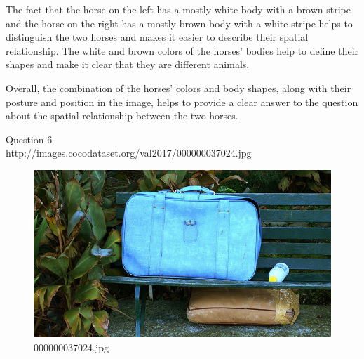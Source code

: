 \begin{enumerate}
        The fact that the horse on the left has a mostly white body with a brown stripe and the horse on the right has a mostly brown body with a white stripe helps to distinguish the two horses and makes it easier to describe their spatial relationship. The white and brown colors of the horses’ bodies help to define their shapes and make it clear that they are different animals.
        
        Overall, the combination of the horses’ colors and body shapes, along with their posture and position in the image, helps to provide a clear answer to the question about the spatial relationship between the two horses.
    \end{enumerate}
Question 6\\
http://images.cocodataset.org/val2017/000000037024.jpg
    \begin{figure}[h]
        \centering
        \includegraphics[width=0.8\linewidth]{../image set/easy/000000037024.jpg}
        \caption{000000037024.jpg}
    \end{figure}
